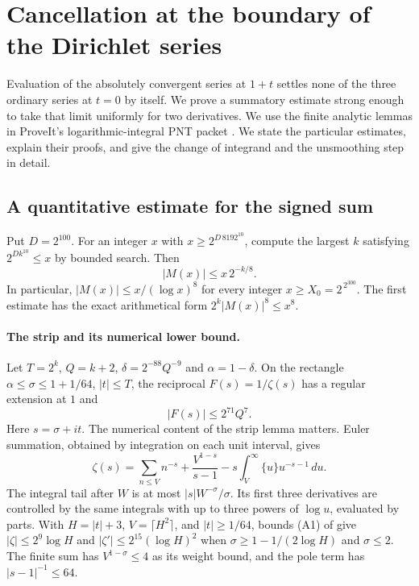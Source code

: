 \section{Cancellation at the boundary of the Dirichlet series}\label{sec:boundary}

Evaluation of the absolutely convergent series at $1+t$ settles none of
the three ordinary series at $t=0$ by itself. We prove a summatory estimate
strong enough to take that limit uniformly for two derivatives. We use
the finite analytic lemmas in ProveIt's logarithmic-integral PNT packet
\cite{strip}. We state the particular estimates, explain their proofs,
and give the change of integrand and the unsmoothing step in detail.

\subsection{A quantitative estimate for the signed sum}

\begin{theorem}\label{thm:strongM}
Put $D=2^{100}$. For an integer $x$ with $x\ge 2^{D\,8192^{10}}$,
compute the largest $k$ satisfying $2^{Dk^{10}}\le x$ by bounded search.
Then
\[
      |M(x)|\le x\,2^{-k/8}.
\]
In particular, $|M(x)|\le x/(\log x)^8$ for every integer
$x\ge X_0=2^{\,2^{300}}$. The first estimate has the exact arithmetical
form $2^k|M(x)|^8\le x^8$.
\end{theorem}

\paragraph{The strip and its numerical lower bound.}
Let $T=2^k$, $Q=k+2$, $\delta=2^{-88}Q^{-9}$ and $\alpha=1-\delta$.
On the rectangle $\alpha\le\sigma\le1+1/64$, $|t|\le T$,
the reciprocal $F(s)=1/\zeta(s)$ has a regular extension at $1$ and
\begin{equation}\label{eq:stripM}
                      |F(s)|\le 2^{71}Q^7 .
\end{equation}
Here $s=\sigma+it$. The numerical content of the strip lemma matters.
Euler summation, obtained by integration on each unit interval, gives
\[
 \zeta(s)=\sum_{n\le V}n^{-s}+\frac{V^{1-s}}{s-1}
          -s\int_V^\infty\{u\}u^{-s-1}\,du.
\]
The integral tail after $W$ is at most $|s|W^{-\sigma}/\sigma$.
Its first three derivatives are controlled by the same integrals with
up to three powers of $\log u$, evaluated by parts. With
$H=|t|+3$, $V=\lceil H^2\rceil$, and $|t|\ge1/64$, bounds (A1)
of \cite{strip} give $|\zeta|\le2^9\log H$ and
$|\zeta'|\le2^{15}(\log H)^2$ when $\sigma\ge1-1/(2\log H)$
and $\sigma\le2$. The finite sum has $V^{1-\sigma}\le4$ as its
weight bound, and the pole term has $|s-1|^{-1}\le64$.

